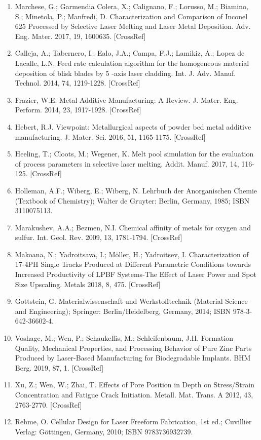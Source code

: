 \documentclass[10pt]{article}
\begin{document}
\begin{enumerate}
  \item Marchese, G.; Garmendia Colera, X.; Calignano, F.; Lorusso, M.; Biamino, S.; Minetola, P.; Manfredi, D. Characterization and Comparison of Inconel 625 Processed by Selective Laser Melting and Laser Metal Deposition. Adv. Eng. Mater. 2017, 19, 1600635. [CrossRef]

  \item Calleja, A.; Tabernero, I.; Ealo, J.A.; Campa, F.J.; Lamikiz, A.; Lopez de Lacalle, L.N. Feed rate calculation algorithm for the homogeneous material deposition of blisk blades by 5 -axis laser cladding. Int. J. Adv. Manuf. Technol. 2014, 74, 1219-1228. [CrossRef]

  \item Frazier, W.E. Metal Additive Manufacturing: A Review. J. Mater. Eng. Perform. 2014, 23, 1917-1928. [CrossRef]

  \item Hebert, R.J. Viewpoint: Metallurgical aspects of powder bed metal additive manufacturing. J. Mater. Sci. 2016, 51, 1165-1175. [CrossRef]

  \item Heeling, T.; Cloots, M.; Wegener, K. Melt pool simulation for the evaluation of process parameters in selective laser melting. Addit. Manuf. 2017, 14, 116-125. [CrossRef]

  \item Holleman, A.F.; Wiberg, E.; Wiberg, N. Lehrbuch der Anorganischen Chemie (Textbook of Chemistry); Walter de Gruyter: Berlin, Germany, 1985; ISBN 3110075113.

  \item Marakushev, A.A.; Bezmen, N.I. Chemical affinity of metals for oxygen and sulfur. Int. Geol. Rev. 2009, 13, 1781-1794. [CrossRef]

  \item Makoana, N.; Yadroitsava, I.; Möller, H.; Yadroitsev, I. Characterization of 17-4PH Single Tracks Produced at Different Parametric Conditions towards Increased Productivity of LPBF Systems-The Effect of Laser Power and Spot Size Upscaling. Metals 2018, 8, 475. [CrossRef]

  \item Gottstein, G. Materialwissenschaft und Werkstofftechnik (Material Science and Engineering); Springer: Berlin/Heidelberg, Germany, 2014; ISBN 978-3-642-36602-4.

  \item Voshage, M.; Wen, P.; Schaukellis, M.; Schleifenbaum, J.H. Formation Quality, Mechanical Properties, and Processing Behavior of Pure Zinc Parts Produced by Laser-Based Manufacturing for Biodegradable Implants. BHM Berg. 2019, 87, 1. [CrossRef]

  \item Xu, Z.; Wen, W.; Zhai, T. Effects of Pore Position in Depth on Stress/Strain Concentration and Fatigue Crack Initiation. Metall. Mat. Trans. A 2012, 43, 2763-2770. [CrossRef]

  \item Rehme, O. Cellular Design for Laser Freeform Fabrication, 1st ed.; Cuvillier Verlag: Göttingen, Germany, 2010; ISBN 9783736932739.

\end{enumerate}
\end{document}
